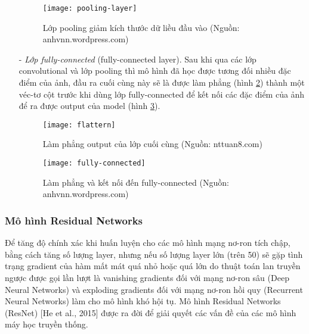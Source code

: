 \begin{itemize}
\begin{figure}[h]
	\centering
	\texttt{[image: pooling-layer]}
	\caption[Lớp pooling giảm kích thước dữ liều đầu vào]{Lớp pooling giảm kích thước dữ liều đầu vào (Nguồn: anhvnn.wordpress.com)}
	\label{fig:pooling-layer}
\end{figure}

\item[-] \emph{Lớp fully-connected} (fully-connected layer).
Sau khi qua các lớp convolutional và lớp pooling thì mô hình đã học được tương đối nhiều đặc điểm của ảnh, đầu ra cuối cùng này sẽ là được làm phẳng (hình \ref{fig:flattern}) thành một véc-tơ cột trước khi dùng lớp fully-connected để kết nối các đặc điểm của ảnh để ra được output của model (hình \ref{fig:fully-connected}).\par

\begin{figure}[h]
	\centering
	\texttt{[image: flattern]}
	\caption[Làm phẳng output của lớp cuối cùng]{Làm phẳng output của lớp cuối cùng (Nguồn: nttuan8.com)}
	\label{fig:flattern}
\end{figure}

\begin{figure}[h]
	\centering
	\texttt{[image: fully-connected]}
	\caption[Làm phẳng lớp cuối cùng và kết nối đến fully-connected]{Làm phẳng và kết nối đến fully-connected (Nguồn: anhvnn.wordpress.com)}
	\label{fig:fully-connected}
\end{figure}

\end{itemize}


\subsubsection{Mô hình Residual Networks}
Để tăng độ chính xác khi huấn luyện cho các mô hình mạng nơ-ron tích chập, bằng cách tăng số lượng layer, nhưng nếu số lượng layer lớn (trên 50) sẽ gặp tình trạng gradient của hàm mất mát quá nhỏ hoặc quá lớn do thuật toán lan truyền ngược được gọi lần lượt là vanishing gradients đối với mạng nơ-ron sâu (Deep Neural Networks) và exploding gradients đối với mạng nơ-ron hồi quy (Recurrent Neural Networks) làm cho mô hình khó hội tụ. Mô hình Residual Networks (ResNet)  [He et al., 2015] \cite{He2015} được ra đời để giải quyết các vấn đề của các mô hình máy học truyền thống. \par

